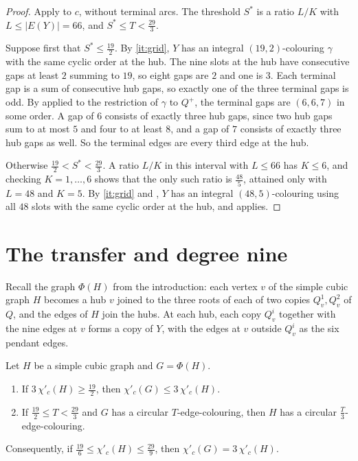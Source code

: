 \documentclass[11pt,colorlinks]{charlie}
\newcommand{\cind}{\chi'_c}
\begin{document}
\begin{proof}
Apply  to $c$, without terminal arcs. The threshold $S^*$ is a ratio $L/K$ with $L\le|E(Y)|=66$, and $S^*\le T<\frac{29}{3}$.

Suppose first that $S^*\le\frac{19}{2}$. By \ref{it:grid}, $Y$ has an integral $(19,2)$-colouring $\gamma$ with the same cyclic order at the hub. The nine slots at the hub have consecutive gaps at least $2$ summing to $19$, so eight gaps are $2$ and one is $3$. Each terminal gap is a sum of consecutive hub gaps, so exactly one of the three terminal gaps is odd. By  applied to the restriction of $\gamma$ to $Q^+$, the terminal gaps are $(6,6,7)$ in some order. A gap of $6$ consists of exactly three hub gaps, since two hub gaps sum to at most $5$ and four to at least $8$, and a gap of $7$ consists of exactly three hub gaps as well. So the terminal edges are every third edge at the hub.

Otherwise $\frac{19}{2}<S^*<\frac{29}{3}$. A ratio $L/K$ in this interval with $L\le66$ has $K\le6$, and checking $K=1,\dots,6$ shows that the only such ratio is $\frac{48}{5}$, attained only with $L=48$ and $K=5$. By \ref{it:grid} and , $Y$ has an integral $(48,5)$-colouring using all $48$ slots with the same cyclic order at the hub, and  applies.
\end{proof}

\section{The transfer and degree nine}\label{sec:transfer}

Recall the graph $\Phi(H)$ from the introduction: each vertex $v$ of the simple cubic graph $H$ becomes a hub $v$ joined to the three roots of each of two copies $Q_v^1,Q_v^2$ of $Q$, and the edges of $H$ join the hubs. At each hub, each copy $Q_v^i$ together with the nine edges at $v$ forms a copy of $Y$, with the edges at $v$ outside $Q_v^i$ as the six pendant edges.

\begin{theorem}\label{thm:transfer}
Let $H$ be a simple cubic graph and $G=\Phi(H)$.
\begin{enumerate}
\item\label{it:up} If $3\,\cind(H)\ge\frac{19}{2}$, then $\cind(G)\le3\,\cind(H)$.
\item\label{it:down} If $\frac{19}{2}\le T<\frac{29}{3}$ and $G$ has a circular $T$-edge-colouring, then $H$ has a circular $\frac T3$-edge-colouring.
\end{enumerate}
Consequently, if $\frac{19}{6}\le\cind(H)\le\frac{29}{9}$, then $\cind(G)=3\,\cind(H)$.
\end{theorem}
\end{document}
